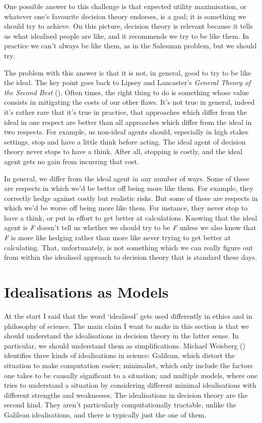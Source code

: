 \documentclass[
  10pt,
  letterpaper,
  DIV=11,
  numbers=noendperiod,
  twoside]{scrartcl}
\begin{document}
One possible answer to this challenge is that expected utility
maximisation, or whatever one's favourite decision theory endorses, is a
goal; it is something we should try to achieve. On this picture,
decision theory is relevant because it tells us what idealised people
are like, and it recommends we try to be like them. In practice we can't
always be like them, as in the Salesman problem, but we should try.

The problem with this answer is that it is not, in general, good to try
to be like the ideal. The key point goes back to Lipsey and Lancaster's
\emph{General Theory of the Second Best}
(). Often
times, the right thing to do is something whose value consists in
mitigating the costs of our other flaws. It's not true in general,
indeed it's rather rare that it's true in practice, that approaches
which differ from the ideal in one respect are better than all
approaches which differ from the ideal in two respects. For example, us
non-ideal agents should, especially in high stakes settings, stop and
have a little think before acting. The ideal agent of decision theory
never stops to have a think. After all, stopping is costly, and the
ideal agent gets no gain from incurring that cost.

In general, we differ from the ideal agent in any number of ways. Some
of these are respects in which we'd be better off being more like them.
For example, they correctly hedge against costly but realistic risks.
But some of these are respects in which we'd be worse off being more
like them. For instance, they never stop to have a think, or put in
effort to get better at calculations. Knowing that the ideal agent is
\emph{F} doesn't tell us whether we should try to be \emph{F} unless we
also know that \emph{F} is more like hedging rather than more like never
trying to get better at calculating. That, unfortunately, is not
something which we can really figure out from within the idealised
approach to decision theory that is standard these days.

\section{Idealisations as Models}\label{idealisations-as-models}

At the start I said that the word `idealised' gets used differently in
ethics and in philosophy of science. The main claim I want to make in
this section is that we should understand the idealisations in decision
theory in the latter sense. In particular, we should understand them as
simplifications. Michael Weisberg ()
identifies three kinds of idealisations in science: Galilean, which
distort the situation to make computation easier; minimalist, which only
include the factors one takes to be causally significant to a situation;
and multiple models, where one tries to understand a situation by
considering different minimal idealisations with different strengths and
weaknesses. The idealisations in decision theory are the second kind.
They aren't particularly computationally tractable, unlike the Galilean
idealisations, and there is typically just the one of them.
\end{document}

